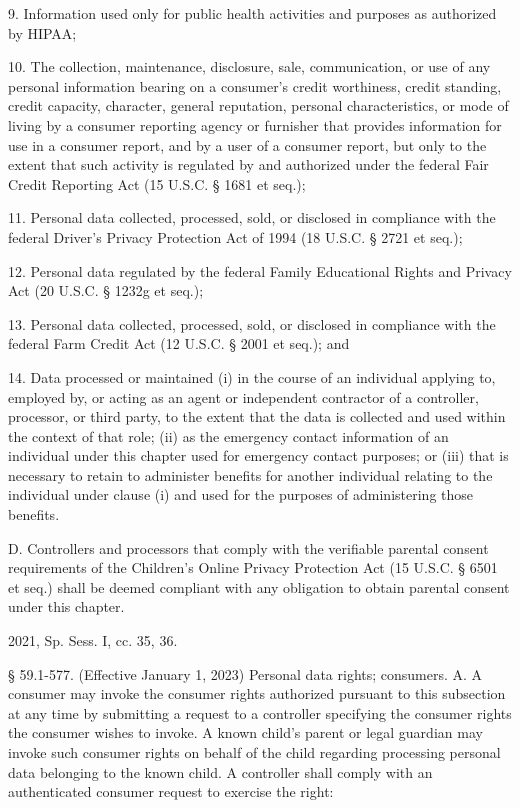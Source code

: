 9. Information used only for public health activities and purposes as authorized by HIPAA;

10. The collection, maintenance, disclosure, sale, communication, or use of any personal information bearing on a consumer's credit worthiness, credit standing, credit capacity, character, general reputation, personal characteristics, or mode of living by a consumer reporting agency or furnisher that provides information for use in a consumer report, and by a user of a consumer report, but only to the extent that such activity is regulated by and authorized under the federal Fair Credit Reporting Act (15 U.S.C. § 1681 et seq.);

11. Personal data collected, processed, sold, or disclosed in compliance with the federal Driver's Privacy Protection Act of 1994 (18 U.S.C. § 2721 et seq.);

12. Personal data regulated by the federal Family Educational Rights and Privacy Act (20 U.S.C. § 1232g et seq.);

13. Personal data collected, processed, sold, or disclosed in compliance with the federal Farm Credit Act (12 U.S.C. § 2001 et seq.); and

14. Data processed or maintained (i) in the course of an individual applying to, employed by, or acting as an agent or independent contractor of a controller, processor, or third party, to the extent that the data is collected and used within the context of that role; (ii) as the emergency contact information of an individual under this chapter used for emergency contact purposes; or (iii) that is necessary to retain to administer benefits for another individual relating to the individual under clause (i) and used for the purposes of administering those benefits.

D. Controllers and processors that comply with the verifiable parental consent requirements of the Children's Online Privacy Protection Act (15 U.S.C. § 6501 et seq.) shall be deemed compliant with any obligation to obtain parental consent under this chapter.

2021, Sp. Sess. I, cc. 35, 36.

§ 59.1-577. (Effective January 1, 2023) Personal data rights; consumers.
A. A consumer may invoke the consumer rights authorized pursuant to this subsection at any time by submitting a request to a controller specifying the consumer rights the consumer wishes to invoke. A known child's parent or legal guardian may invoke such consumer rights on behalf of the child regarding processing personal data belonging to the known child. A controller shall comply with an authenticated consumer request to exercise the right:


